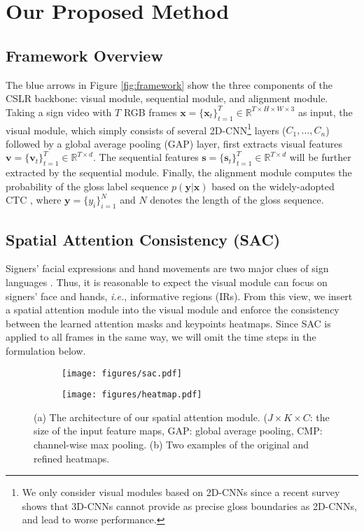 \documentclass[acmsmall,screen]{acmart}
\def\ie{\emph{i.e.}} \def\Ie{\emph{I.e.}}
\def \mbf{\mathbf}
\begin{document}
 \section{Our Proposed Method}
\subsection{Framework Overview}
\label{sec:overview}
The blue arrows in Figure \ref{fig:framework} show the three components of the CSLR backbone: visual module, sequential module, and alignment module.
Taking a sign video with $T$ RGB frames $\mbf{x}=\{\mbf{x}_t\}_{t=1}^T \in \mathbb{R}^{T\times H \times W \times 3}$ as input, the visual module, which simply consists of several 2D-CNN\footnote{We only consider visual modules based on 2D-CNNs since a recent survey \cite{survey} shows that 3D-CNNs cannot provide as precise gloss boundaries as 2D-CNNs, and lead to worse performance.} layers ($C_1, \dots, C_n$) followed by a global average pooling (GAP) layer, first extracts visual features $\mbf{v}=\{\mbf{v}_t\}_{t=1}^T \in \mathbb{R}^{T\times d}$.
The sequential features $\mbf{s}=\{\mbf{s}_t\}_{t=1}^T \in \mathbb{R}^{T\times d}$ will be further extracted by the sequential module.
Finally, the alignment module computes the probability of the gloss label sequence $p(\mbf{y}|\mbf{x})$ based on the widely-adopted CTC \cite{ctc}, where $\mbf{y}=\{y_i\}_{i=1}^N$ and $N$ denotes the length of the gloss sequence.


\subsection{Spatial Attention Consistency (SAC)}
Signers' facial expressions and hand movements are two major clues of sign languages \cite{koller2020quantitative, stmc}.
Thus, it is reasonable to expect the visual module can focus on signers' face and hands, \ie, informative regions (IRs).
From this view, we insert a spatial attention module into the visual module and enforce the consistency between the learned attention masks and keypoints heatmaps.
Since SAC is applied to all frames in the same way, we will omit the time steps in the formulation below.



\begin{figure}[t]
\begin{subfigure}[t]{.5\textwidth}
 \centering
 \texttt{[image: figures/sac.pdf]}
 \caption{}
 \label{fig:sac}
\end{subfigure}
\hfill
\begin{subfigure}[t]{.45\textwidth}
  \centering
  \texttt{[image: figures/heatmap.pdf]}
  \caption{}
  \label{fig:heatmap}
\end{subfigure}
\caption{(a) The architecture of our spatial attention module. ($J\times K\times C$: the size of the input feature maps, GAP: global average pooling, CMP: channel-wise max pooling. (b) Two examples of the original and refined heatmaps.}
\end{figure}
\end{document}
